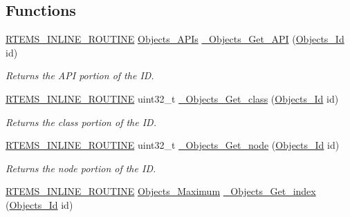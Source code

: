 \subsection*{Functions}
\begin{DoxyCompactItemize}
\item 
\mbox{\hyperlink{group__RTEMSScoreBaseDefs_gac216239df231d5dbd15e3520b0b9313f}{R\+T\+E\+M\+S\+\_\+\+I\+N\+L\+I\+N\+E\+\_\+\+R\+O\+U\+T\+I\+NE}} \mbox{\hyperlink{group__RTEMSScoreObject_ga2d2636c8d2f1564f3e5b2b14e761574b}{Objects\+\_\+\+A\+P\+Is}} \mbox{\hyperlink{group__RTEMSScoreObject_ga907a0412d7c657fa047641444090fe7b}{\+\_\+\+Objects\+\_\+\+Get\+\_\+\+A\+PI}} (\mbox{\hyperlink{group__RTEMSScoreObject_ga5821f52a51072941bdd603e542d0863e}{Objects\+\_\+\+Id}} id)
\begin{DoxyCompactList}\small\item\em Returns the A\+PI portion of the ID. \end{DoxyCompactList}\item 
\mbox{\hyperlink{group__RTEMSScoreBaseDefs_gac216239df231d5dbd15e3520b0b9313f}{R\+T\+E\+M\+S\+\_\+\+I\+N\+L\+I\+N\+E\+\_\+\+R\+O\+U\+T\+I\+NE}} uint32\+\_\+t \mbox{\hyperlink{group__RTEMSScoreObject_ga450c379424f26235d60f702638d229fa}{\+\_\+\+Objects\+\_\+\+Get\+\_\+class}} (\mbox{\hyperlink{group__RTEMSScoreObject_ga5821f52a51072941bdd603e542d0863e}{Objects\+\_\+\+Id}} id)
\begin{DoxyCompactList}\small\item\em Returns the class portion of the ID. \end{DoxyCompactList}\item 
\mbox{\hyperlink{group__RTEMSScoreBaseDefs_gac216239df231d5dbd15e3520b0b9313f}{R\+T\+E\+M\+S\+\_\+\+I\+N\+L\+I\+N\+E\+\_\+\+R\+O\+U\+T\+I\+NE}} uint32\+\_\+t \mbox{\hyperlink{group__RTEMSScoreObject_ga2a5fbd3f068704dab10f651f6aa12d6d}{\+\_\+\+Objects\+\_\+\+Get\+\_\+node}} (\mbox{\hyperlink{group__RTEMSScoreObject_ga5821f52a51072941bdd603e542d0863e}{Objects\+\_\+\+Id}} id)
\begin{DoxyCompactList}\small\item\em Returns the node portion of the ID. \end{DoxyCompactList}\item 
\mbox{\hyperlink{group__RTEMSScoreBaseDefs_gac216239df231d5dbd15e3520b0b9313f}{R\+T\+E\+M\+S\+\_\+\+I\+N\+L\+I\+N\+E\+\_\+\+R\+O\+U\+T\+I\+NE}} \mbox{\hyperlink{group__RTEMSScoreObject_gaa2735357885ec7d7157c32f3f835f9ae}{Objects\+\_\+\+Maximum}} \mbox{\hyperlink{group__RTEMSScoreObject_ga22cdf45f285840b7728b06197a7f4627}{\+\_\+\+Objects\+\_\+\+Get\+\_\+index}} (\mbox{\hyperlink{group__RTEMSScoreObject_ga5821f52a51072941bdd603e542d0863e}{Objects\+\_\+\+Id}} id)

\end{DoxyCompactItemize}
